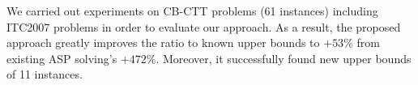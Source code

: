 \documentclass[dvipdfmx,a4paper]{jsarticle}
\begin{document}

We carried out experiments on CB-CTT problems (61 instances)
including ITC2007 problems 
in order to evaluate our approach. 
As a result, 
the proposed approach greatly improves 
the ratio to known upper bounds to $+53\%$ 
from existing ASP solving's $+472\%$. 
Moreover, it successfully 
found new upper bounds of 11 instances.
\end{document}
